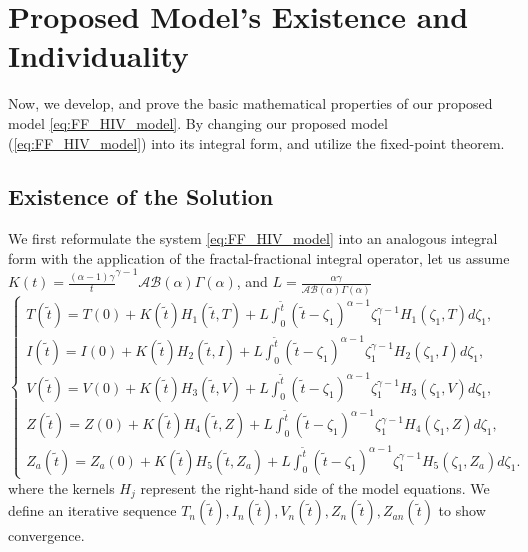 \documentclass[10pt,a4paper]{amsart}
\numberwithin{equation}{section}
\begin{document}
\section{Proposed Model's Existence and Individuality}
Now, we develop, and prove the basic mathematical properties of our proposed model \eqref{eq:FF_HIV_model}. By changing our proposed model (\ref{eq:FF_HIV_model}) into its integral form, and utilize the fixed-point theorem.

\subsection{Existence of the Solution}
We first reformulate the system \eqref{eq:FF_HIV_model} into an analogous integral form with the application of the fractal-fractional integral operator, let us assume $K(t)= \frac{(\alpha-1)\gamma}t^{\gamma-1}{\mathcal{AB(\alpha)}\Gamma(\alpha)}$, and $L = \frac{\alpha\gamma}{\mathcal{AB(\alpha)}\Gamma(\alpha)}$ \\
\begin{equation}
	\label{eq:integral_system}
	\begin{cases}
		T(\tilde{t}) = T(0) + K(\tilde{t})H_1(\tilde{t}, T) + L \int_0^{\tilde{t}} (\tilde{t}-\zeta_1)^{\alpha-1} \zeta_1^{\gamma-1} H_1(\zeta_1, T) d\zeta_1, \\
		I(\tilde{t}) = I(0) + K(\tilde{t}) H_2(\tilde{t}, I) + L \int_0^{\tilde{t}} (\tilde{t}-\zeta_1)^{\alpha-1} \zeta_1^{\gamma-1} H_2(\zeta_1, I) d\zeta_1, \\
		V(\tilde{t}) = V(0) + K(\tilde{t}) H_3(\tilde{t}, V) + L \int_0^{\tilde{t}} (\tilde{t}-\zeta_1)^{\alpha-1} \zeta_1^{\gamma-1} H_3(\zeta_1, V) d\zeta_1, \\
		Z(\tilde{t}) = Z(0) + K(\tilde{t}) H_4(\tilde{t}, Z) + L \int_0^{\tilde{t}} (\tilde{t}-\zeta_1)^{\alpha-1} \zeta_1^{\gamma-1} H_4(\zeta_1, Z) d\zeta_1, \\
		Z_{a}(\tilde{t}) = Z_a(0) + K(\tilde{t}) H_5(\tilde{t}, Z_a) + L \int_0^{\tilde{t}} (\tilde{t}-\zeta_1)^{\alpha-1} \zeta_1^{\gamma-1} H_5(\zeta_1, Z_a) d\zeta_1.
	\end{cases}
\end{equation}
where the kernels $H_j$ represent the right-hand side of the model equations. We define an iterative sequence $T_n(\tilde{t}), I_n(\tilde{t}), V_n(\tilde{t}), Z_n(\tilde{t}), Z_{an}(\tilde{t})$ to show convergence.
\end{document}
